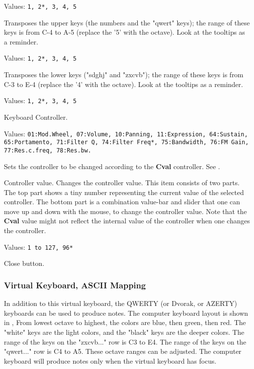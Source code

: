    Values: \texttt{1, 2*, 3, 4, 5}

   Transposes the upper keys (the numbers and the "qwert" keys);
   the range of these keys is from C-4 to A-5 (replace the '5' with the octave).
   Look at the tooltips as a reminder.

   Values: \texttt{1, 2*, 3, 4, 5}

   Transposes the lower keys ("sdghj" and "zxcvb"); the range of these keys is
   from C-3 to E-4 (replace the '4' with the octave).  Look at the tooltips as a
   reminder.

   Values: \texttt{1, 2*, 3, 4, 5}

   Keyboard Controller.

   Values: \texttt{01:Mod.Wheel, 07:Volume, 10:Panning,
      11:Expression, 64:Sustain, 65:Portamento, 71:Filter Q,
      74:Filter Freq*, 75:Bandwidth, 76:FM Gain,
      77:Res.c.freq, 78:Res.bw.}

   Sets the controller to be changed according to the \textbf{Cval}
   controller.
   See .

   Controller value.
   Changes the controller value.
   This item consists of two parts.  The top part shows a tiny
   number representing the current value of the selected controller.
   The bottom part is a combination value-bar and slider that one
   can move up and down with the mouse, to change the controller value.
   Note that the \textbf{Cval} value might not reflect the
   internal value of the controller when one changes the controller.

   Values: \texttt{1 to 127, 96*}

   Close button.

\subsubsection{Virtual Keyboard, ASCII Mapping}
\label{subsubsec:virtual_keyboard_ascii}

   In addition to this virtual keyboard, the QWERTY (or Dvorak, or AZERTY)
   keyboards can be used to produce notes.
   The computer keyboard layout is shown in
   ,
   From lowest octave to highest, the colors are blue, then green, then red.
   The "white" keys are the light colors, and the "black" keys are the
   deeper colors.
   The range of the keys on the "zxcvb..." row is C3 to E4.
   The range of the keys on the "qwert..." row is C4 to A5.
   These octave ranges can be adjusted.
   The computer keyboard will produce notes only when the virtual keyboard
   has focus.

